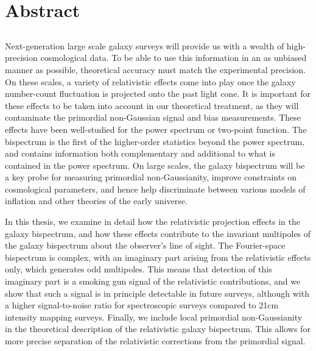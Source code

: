 \chapter*{Abstract}
\label{ch:abstract}
\section*{}
\singlespacing


Next-generation large scale galaxy surveys will provide us with a wealth of high-precision cosmological data. To be able to use this information in an as unbiased manner as possible, theoretical accuracy must match the experimental precision. On these scales, a variety of relativistic effects come into play once the galaxy number-count fluctuation is projected onto the past light cone. It is important for these effects to be taken into account in our theoretical treatment, as they will contaminate the primordial non-Gaussian signal and bias measurements. These effects have been well-studied for the power spectrum or two-point function. The bispectrum is the first of the higher-order statistics beyond the power spectrum, and contains information both complementary and additional to what is contained in the power spectrum. On large scales, the galaxy bispectrum will be a key probe for measuring primordial non-Gaussianity, improve constraints on cosmological parameters, and hence help discriminate between various models of inflation and other theories of the early universe. 

In this thesis, we examine in detail how the relativistic projection effects in the galaxy bispectrum, and how these effects contribute to the invariant multipoles of the galaxy bispectrum about the observer's line of sight. The Fourier-space bispectrum is complex, with an imaginary part arising from the relativistic effects only, which generates odd multipoles. This means that detection of this imaginary part is a smoking gun signal of the relativistic contributions, and we show that such a signal is in principle detectable in future surveys, although with a higher signal-to-noise ratio for spectroscopic surveys compared to 21cm intensity mapping surveys. Finally, we include local primordial non-Gaussianity in the theoretical description of the relativistic galaxy bispectrum. This allows for more precise separation of the relativistic corrections from the primordial signal.
